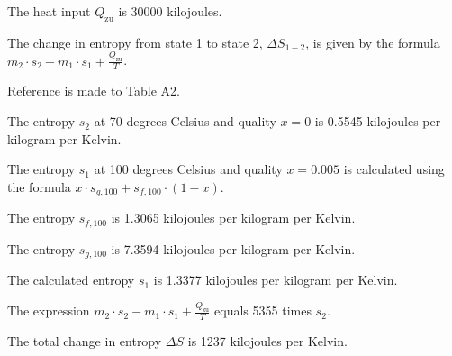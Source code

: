 The heat input \( Q_{\text{zu}} \) is 30000 kilojoules.

The change in entropy from state 1 to state 2, \( \Delta S_{1-2} \), is given by the formula \( m_2 \cdot s_2 - m_1 \cdot s_1 + \frac{Q_{\text{zu}}}{T} \).

Reference is made to Table A2.

The entropy \( s_2 \) at 70 degrees Celsius and quality \( x = 0 \) is 0.5545 kilojoules per kilogram per Kelvin.

The entropy \( s_1 \) at 100 degrees Celsius and quality \( x = 0.005 \) is calculated using the formula \( x \cdot s_{g,100} + s_{f,100} \cdot (1-x) \).

The entropy \( s_{f,100} \) is 1.3065 kilojoules per kilogram per Kelvin.

The entropy \( s_{g,100} \) is 7.3594 kilojoules per kilogram per Kelvin.

The calculated entropy \( s_1 \) is 1.3377 kilojoules per kilogram per Kelvin.

The expression \( m_2 \cdot s_2 - m_1 \cdot s_1 + \frac{Q_{\text{zu}}}{T} \) equals 5355 times \( s_2 \).

The total change in entropy \( \Delta S \) is 1237 kilojoules per Kelvin.